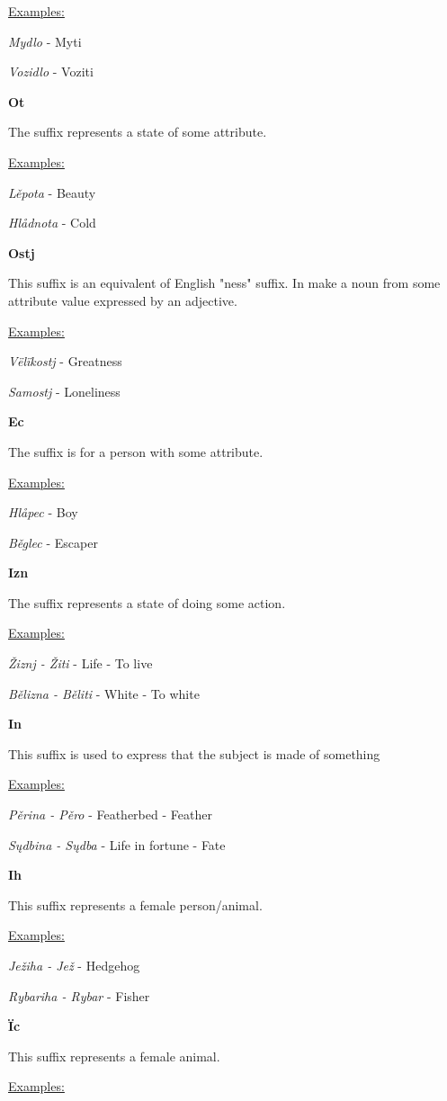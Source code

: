 \underline{Examples:}

\textit{Mydlo} - Myti

\textit{Vozidlo} - Voziti

\textbf{Ot}

The suffix represents a state of some attribute.

\underline{Examples:}

\textit{Lěpota} - Beauty

\textit{Hlådnota} - Cold

\textbf{Ostj}

This suffix is an equivalent of English "ness" suffix. In make a noun from some attribute value expressed by an adjective.

\underline{Examples:}

\textit{Vëlïkostj} - Greatness

\textit{Samostj} - Loneliness

\textbf{Ec}

The suffix is for a person with some attribute.

\underline{Examples:}

\textit{Hlåpec} - Boy

\textit{Běglec} - Escaper

\textbf{Izn}

The suffix represents a state of doing some action.

\underline{Examples:}

\textit{Žiznj - Žiti} - Life - To live

\textit{Bělizna - Běliti} - White - To white

\textbf{In}

This suffix is used to express that the subject is made of something

\underline{Examples:}

\textit{Pěrina - Pěro} - Featherbed - Feather

\textit{Sųdbina - Sųdba} - Life in fortune - Fate

\textbf{Ih}

This suffix represents a female person/animal.

\underline{Examples:}

\textit{Ježiha - Jež} - Hedgehog

\textit{Rybariha - Rybar} - Fisher

\textbf{Ïc}

This suffix represents a female animal.

\underline{Examples:}

